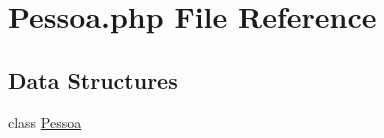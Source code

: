 \hypertarget{_pessoa_8php}{}\section{Pessoa.\+php File Reference}
\label{_pessoa_8php}
\subsection*{Data Structures}
\begin{DoxyCompactItemize}
\item 
class \hyperlink{class_pessoa}{Pessoa}
\end{DoxyCompactItemize}
